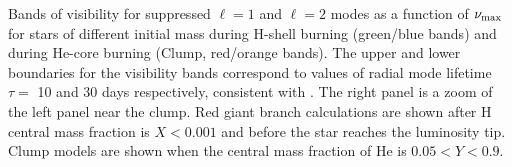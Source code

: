 \label{fig:visibility} Bands of visibility for suppressed $\ell=1$ and $\ell=2$ modes as a function of $\nu_{\rm max}$ for stars of different initial mass during H-shell burning (green/blue bands) and during He-core burning (Clump, red/orange bands). The upper and lower boundaries for the visibility bands correspond to values of radial mode lifetime $\tau=$ 10 and 30 days respectively, consistent with \cite{Dupret_2009,Corsaro_2015}. The right panel is a zoom of the left panel near the clump. Red giant branch calculations are shown after H central mass fraction is $ X < 0.001$ and before the star reaches the luminosity tip. Clump models are shown when the central mass fraction of He is $0.05 < Y < 0.9$.

  
  
  
  
  